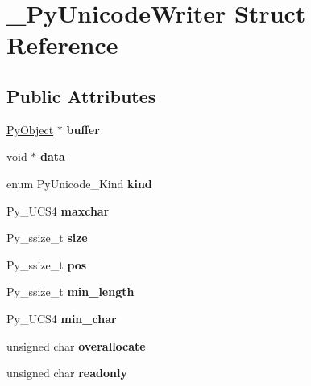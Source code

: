 \hypertarget{struct__PyUnicodeWriter}{}\section{\+\_\+\+Py\+Unicode\+Writer Struct Reference}
\label{struct__PyUnicodeWriter}
\subsection*{Public Attributes}
\begin{DoxyCompactItemize}
\item 
\hyperlink{struct__object}{Py\+Object} $\ast$ {\bfseries buffer}\hypertarget{struct__PyUnicodeWriter_a5bcc85de8f76d8196df8a3c505308c43}{}\label{struct__PyUnicodeWriter_a5bcc85de8f76d8196df8a3c505308c43}

\item 
void $\ast$ {\bfseries data}\hypertarget{struct__PyUnicodeWriter_a76841c44766ba1dd8edac4090dd49719}{}\label{struct__PyUnicodeWriter_a76841c44766ba1dd8edac4090dd49719}

\item 
enum Py\+Unicode\+\_\+\+Kind {\bfseries kind}\hypertarget{struct__PyUnicodeWriter_aff601d1b8b3ff02098c054df62519975}{}\label{struct__PyUnicodeWriter_aff601d1b8b3ff02098c054df62519975}

\item 
Py\+\_\+\+U\+C\+S4 {\bfseries maxchar}\hypertarget{struct__PyUnicodeWriter_a87830f0cdce1296dde1c74fd1d023b47}{}\label{struct__PyUnicodeWriter_a87830f0cdce1296dde1c74fd1d023b47}

\item 
Py\+\_\+ssize\+\_\+t {\bfseries size}\hypertarget{struct__PyUnicodeWriter_a85019c080568bc2e8b2be77bea1a3272}{}\label{struct__PyUnicodeWriter_a85019c080568bc2e8b2be77bea1a3272}

\item 
Py\+\_\+ssize\+\_\+t {\bfseries pos}\hypertarget{struct__PyUnicodeWriter_ae0784032b2a208e5330cd5cfd462b378}{}\label{struct__PyUnicodeWriter_ae0784032b2a208e5330cd5cfd462b378}

\item 
Py\+\_\+ssize\+\_\+t {\bfseries min\+\_\+length}\hypertarget{struct__PyUnicodeWriter_aba90b9400b7eac0c23e9bb91afa88d27}{}\label{struct__PyUnicodeWriter_aba90b9400b7eac0c23e9bb91afa88d27}

\item 
Py\+\_\+\+U\+C\+S4 {\bfseries min\+\_\+char}\hypertarget{struct__PyUnicodeWriter_ac337475e706576ffc96d46015570f52c}{}\label{struct__PyUnicodeWriter_ac337475e706576ffc96d46015570f52c}

\item 
unsigned char {\bfseries overallocate}\hypertarget{struct__PyUnicodeWriter_a8568e42ffbeaa7587bc59d0a47b899ba}{}\label{struct__PyUnicodeWriter_a8568e42ffbeaa7587bc59d0a47b899ba}

\item 
unsigned char {\bfseries readonly}\hypertarget{struct__PyUnicodeWriter_a3db581c84815a5c32279e117d958a72e}{}\label{struct__PyUnicodeWriter_a3db581c84815a5c32279e117d958a72e}

\end{DoxyCompactItemize}


